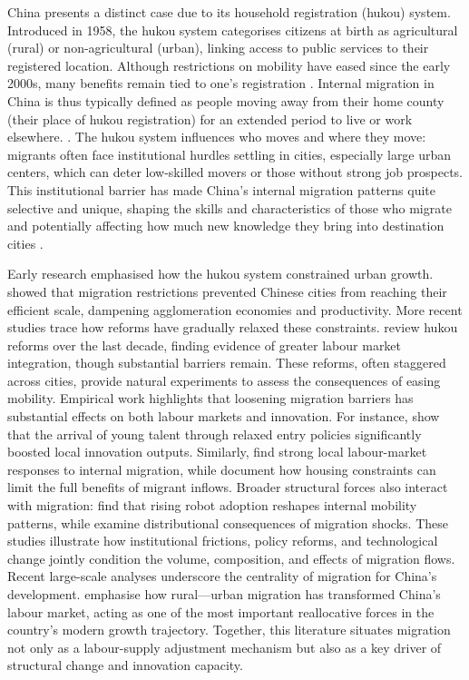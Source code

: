 \documentclass[12pt]{article}
\begin{document}
China presents a distinct case due to its household registration (hukou) system. 
Introduced in 1958, the hukou system categorises citizens at birth as agricultural (rural) or non-agricultural (urban), linking access to public services to their registered location. Although restrictions on mobility have eased since the early 2000s, many benefits remain tied to one's registration \citep{songDeepAnalysisChinese2023, chenRecentProgressHukou2024}. Internal migration in China is thus typically defined as people moving away from their home county (their place of hukou registration) for an extended period to live or work elsewhere. \citep{zhangDatasetDynamicMonitoring2023}. The hukou system influences who moves and where they move: migrants often face institutional hurdles settling in cities, especially large urban centers, which can deter low-skilled movers or those without strong job prospects. This institutional barrier has made China's internal migration patterns quite selective and unique, shaping the skills and characteristics of those who migrate and potentially affecting how much new knowledge they bring into destination cities \citep{zhouHukouSystemSelective2022}.

Early research emphasised how the hukou system constrained urban growth. \citet{auHowMigrationRestrictions2006} showed that migration restrictions prevented Chinese cities from reaching their efficient scale, dampening agglomeration economies and productivity. More recent studies trace how reforms have gradually relaxed these constraints. \citet{chenRecentProgressHukou2024} review hukou reforms over the last decade, finding evidence of greater labour market integration, though substantial barriers remain. These reforms, often staggered across cities, provide natural experiments to assess the consequences of easing mobility. Empirical work highlights that loosening migration barriers has substantial effects on both labour markets and innovation. For instance, \citet{chenArrivalYoungTalent2020} show that the arrival of young talent through relaxed entry policies significantly boosted local innovation outputs. Similarly, \citet{anLocalLaborMarket2024} find strong local labour-market responses to internal migration, while \citet{fangMigrationHousingConstraints2022} document how housing constraints can limit the full benefits of migrant inflows. Broader structural forces also interact with migration: \citet{bianEffectsRobotsInternal2024} find that rising robot adoption reshapes internal mobility patterns, while \citet{douPainGainEffects2024} examine distributional consequences of migration shocks. These studies illustrate how institutional frictions, policy reforms, and technological change jointly condition the volume, composition, and effects of migration flows. Recent large-scale analyses underscore the centrality of migration for China's development. \citet{eggerRuralUrbanMigrationMarket2025} emphasise how rural---urban migration has transformed China's labour market, acting as one of the most important reallocative forces in the country's modern growth trajectory. Together, this literature situates migration not only as a labour-supply adjustment mechanism but also as a key driver of structural change and innovation capacity.  
\end{document}
